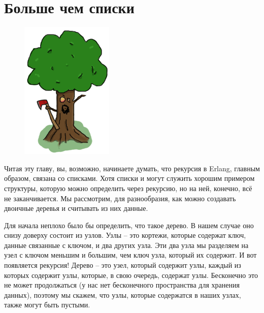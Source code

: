 \documentclass[a4paper,12pt]{report}
\begin{document}
\section{Больше чем списки}
\begin{figure}
    \includegraphics[width=1\linewidth]{tree.png}
\end{figure}
Читая эту главу, вы, возможно, начинаете думать, что рекурсия в Erlang, главным образом, связана со списками. Хотя списки и могут служить хорошим примером структуры, которую можно определить через рекурсию, но на ней, конечно, всё не заканчивается. Мы рассмотрим, для разнообразия, как можно создавать двоичные деревья и считывать из них данные.

Для начала неплохо было бы определить, что такое дерево. В нашем случае оно снизу доверху состоит из узлов. Узлы \--- это кортежи, которые содержат ключ, данные связанные с ключом, и два других узла. Эти два узла мы разделяем на узел с ключом меньшим и большим, чем ключ узла, который их содержит. И вот появляется рекурсия! Дерево \--- это узел, который содержит узлы, каждый из которых содержит узлы, которые, в свою очередь, содержат узлы. Бесконечно это не может продолжаться (у нас нет бесконечного пространства для хранения данных), поэтому мы скажем, что узлы, которые содержатся в наших узлах, также могут быть пустыми.
\end{document}
